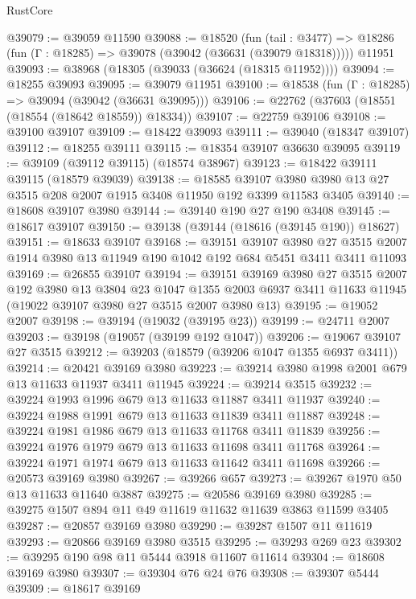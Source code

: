 \begin{lexlean}{RustCore}
\begin{coremodule}
@39079 := @39059 @11590
@39088 := @18520
    (fun (tail : @3477) => @18286 (fun (Γ : @18285) => @39078 (@39042 (@36631 (@39079 @18318)))))
    @11951
@39093 := @38968 (@18305 (@39033 (@36624 (@18315 @11952))))
@39094 := @18255 @39093
@39095 := @39079 @11951
@39100 := @18538 (fun (Γ : @18285) => @39094 (@39042 (@36631 @39095)))
@39106 := @22762 (@37603 (@18551 (@18554 (@18642 @18559)) @18334))
@39107 := @22759 @39106
@39108 := @39100 @39107
@39109 := @18422 @39093
@39111 := @39040 (@18347 @39107)
@39112 := @18255 @39111
@39115 := @18354 @39107 @36630 @39095
@39119 := @39109 (@39112 @39115) (@18574 @38967)
@39123 := @18422 @39111 @39115 (@18579 @39039)
@39138 := @18585
    @39107
    @3980
    @3980
    @13
    @27
    @3515
    @208
    @2007
    @1915
    @3408
    @11950
    @192
    @3399
    @11583
    @3405
@39140 := @18608 @39107 @3980
@39144 := @39140 @190 @27 @190 @3408
@39145 := @18617 @39107
@39150 := @39138 (@39144 (@18616 (@39145 @190)) @18627)
@39151 := @18633 @39107
@39168 := @39151
    @39107
    @3980
    @27
    @3515
    @2007
    @1914
    @3980
    @13
    @11949
    @190
    @1042
    @192
    @684
    @5451
    @3411
    @3411
    @11093
@39169 := @26855 @39107
@39194 := @39151
    @39169
    @3980
    @27
    @3515
    @2007
    @192
    @3980
    @13
    @3804
    @23
    @1047
    @1355
    @2003
    @6937
    @3411
    @11633
    @11945
    (@19022 @39107 @3980 @27 @3515 @2007 @3980 @13)
@39195 := @19052 @2007
@39198 := @39194 (@19032 (@39195 @23))
@39199 := @24711 @2007
@39203 := @39198 (@19057 (@39199 @192 @1047))
@39206 := @19067 @39107 @27 @3515
@39212 := @39203 (@18579 (@39206 @1047 @1355 @6937 @3411))
@39214 := @20421 @39169 @3980
@39223 := @39214 @3980 @1998 @2001 @679 @13 @11633 @11937 @3411 @11945
@39224 := @39214 @3515
@39232 := @39224 @1993 @1996 @679 @13 @11633 @11887 @3411 @11937
@39240 := @39224 @1988 @1991 @679 @13 @11633 @11839 @3411 @11887
@39248 := @39224 @1981 @1986 @679 @13 @11633 @11768 @3411 @11839
@39256 := @39224 @1976 @1979 @679 @13 @11633 @11698 @3411 @11768
@39264 := @39224 @1971 @1974 @679 @13 @11633 @11642 @3411 @11698
@39266 := @20573 @39169 @3980
@39267 := @39266 @657
@39273 := @39267 @1970 @50 @13 @11633 @11640 @3887
@39275 := @20586 @39169 @3980
@39285 := @39275 @1507 @894 @11 @49 @11619 @11632 @11639 @3863 @11599 @3405
@39287 := @20857 @39169 @3980
@39290 := @39287 @1507 @11 @11619
@39293 := @20866 @39169 @3980 @3515
@39295 := @39293 @269 @23
@39302 := @39295 @190 @98 @11 @5444 @3918 @11607 @11614
@39304 := @18608 @39169 @3980
@39307 := @39304 @76 @24 @76
@39308 := @39307 @5444
@39309 := @18617 @39169

\end{coremodule}
\end{lexlean}
